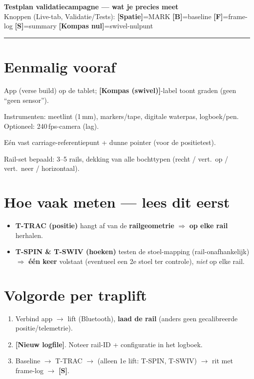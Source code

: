 \documentclass[10pt,a4paper]{article}
\newcommand{\btn}[1]{\textbf{[#1]}}
\begin{document}
\begin{center}
{\Large\bfseries Testplan validatiecampagne — wat je precies meet}\\[2pt]
{\small Knoppen (Live-tab, Validatie/Tests): \btn{Spatie}=MARK \quad \btn{B}=baseline \quad \btn{F}=frame-log \quad \btn{S}=summary \quad \btn{Kompas nul}=swivel-nulpunt}
\end{center}

\vspace{2pt}\hrule\vspace{4pt}

\section{Eenmalig vooraf}
\begin{cb}
\item App (verse build) op de tablet; \btn{Kompas (swivel)}-label toont graden (geen ``geen sensor'').
\item Instrumenten: meetlint (1\,mm), markers/tape, digitale waterpas, logboek/pen. Optioneel: 240\,fps-camera (lag).
\item Eén vast carriage-referentiepunt + dunne pointer (voor de positietest).
\item Rail-set bepaald: 3--5 rails, dekking van alle bochttypen (recht / vert.\ op / vert.\ neer / horizontaal).
\end{cb}

\section{Hoe vaak meten — lees dit eerst}
\begin{itemize}[leftmargin=1.4em,itemsep=1pt,topsep=2pt]
\item[$\rightarrow$] \textbf{T-TRAC (positie)} hangt af van de \textbf{railgeometrie} $\Rightarrow$ \textbf{op elke rail} herhalen.
\item[$\rightarrow$] \textbf{T-SPIN \& T-SWIV (hoeken)} testen de stoel-mapping (rail-onafhankelijk) $\Rightarrow$ \textbf{één keer} volstaat (eventueel een 2e stoel ter controle), \emph{niet} op elke rail.
\end{itemize}

\section{Volgorde per traplift}
\begin{enumerate}[leftmargin=1.6em,itemsep=1pt,topsep=2pt]
\item Verbind app $\rightarrow$ lift (Bluetooth), \textbf{laad de rail} (anders geen gecalibreerde positie/telemetrie).
\item \btn{Nieuw logfile}. Noteer rail-ID + configuratie in het logboek.
\item Baseline $\rightarrow$ T-TRAC $\rightarrow$ (alleen 1e lift: T-SPIN, T-SWIV) $\rightarrow$ rit met frame-log $\rightarrow$ \btn{S}.
\end{enumerate}
\end{document}
